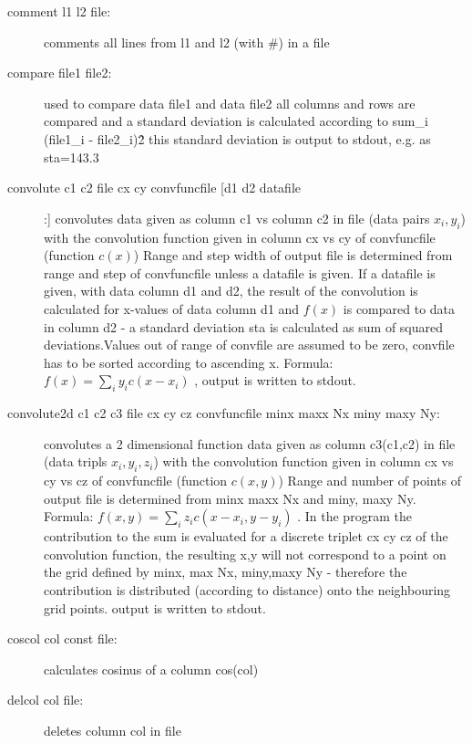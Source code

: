 \begin{description}
\item [\prg comment l1 l2 file:] comments all lines from l1 and l2  (with \#) in a file
\item [\prg compare file1 file2:] used to compare data file1 and data file2
                all columns and rows are compared and a standard deviation
                is calculated according to sum\_i (file1\_i - file2\_i)\^2
                this standard deviation is output to stdout, e.g. as sta=143.3
\item [\prg convolute c1 c2 file cx cy convfuncfile [d1 d2 datafile]:] %
convolutes data given as column c1 vs column
                       c2 in file (data pairs $x_i,y_i$) with the convolution function given in %
column cx vs cy
		        of convfuncfile (function $c(x)$)
		       Range and step width of output file is determined from range and step 
		        of convfuncfile  unless a datafile is given. If a datafile is given, 
		     with data column d1 and d2, the result of the convolution is
		     calculated for x-values of data column d1 and $f(x)$ is compared to
		     data in column d2 - a standard deviation sta is calculated as
		     sum of squared deviations.Values out of range of convfile are assumed to be zero,
			convfile has to be sorted according to ascending x.
			Formula: $f(x)=\sum_i y_i c(x-x_i)$ , 
		       output is written to stdout. 
\item [\prg convolute2d c1 c2 c3 file cx cy cz convfuncfile minx maxx Nx miny maxy Ny:] 
convolutes a 2 dimensional function data given as column c3(c1,c2) in file (data tripls $x_i,y_i, z_i$) with the convolution function given in column cx vs cy vs cz
		        of convfuncfile (function $c(x,y)$)
		       Range and number of points of output file is determined from minx maxx Nx and 
                        miny, maxy Ny.
			Formula: $f(x,y)=\sum_i z_i c(x-x_i,y-y_i)$ . In the program the contribution to
                        the sum is evaluated for a discrete triplet cx cy cz of the convolution function, the 
                        resulting x,y will not correspond to a point on the grid defined by minx, max Nx, miny,maxy Ny -
                        therefore the contribution is distributed (according to distance) onto the neighbouring grid
                       points.
		       output is written to stdout. 
\item [\prg coscol col const file:] calculates cosinus of a column cos(col) 
\item [\prg delcol col file:] deletes column col in file

\end{description}
